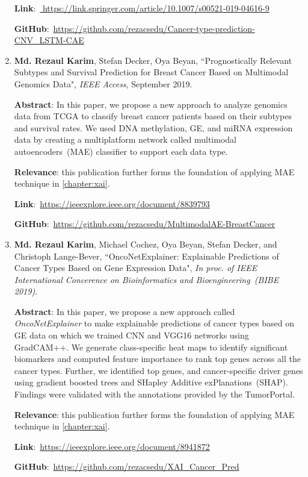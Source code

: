 \begin{enumerate}
	\textbf{Link}:~\url{	https://link.springer.com/article/10.1007/s00521-019-04616-9}
	
	\textbf{GitHub}:~\url{https://github.com/rezacsedu/Cancer-type-prediction-CNV_LSTM-CAE} 
	
	\item \textbf{Md. Rezaul Karim}, Stefan Decker, Oya Beyan, ``Prognostically Relevant Subtypes and Survival Prediction for Breast Cancer Based on Multimodal Genomics Data", \emph{IEEE Access}, September 2019.
	
	\textbf{Abstract}: In this paper, we propose a new approach to analyze genomics data from TCGA to classify breast cancer patients based on their subtypes and survival rates. We used DNA methylation, GE, and miRNA expression data by creating a multiplatform network called multimodal autoencoders~(MAE) classifier to support each data type.
	
	\textbf{Relevance}: this publication further forms the foundation of applying MAE technique in \cref{chapter:xai}.
	
	\textbf{Link}:~\url{https://ieeexplore.ieee.org/document/8839793}
	
	\textbf{GitHub}:~\url{https://github.com/rezacsedu/MultimodalAE-BreastCancer}
	
	\item \textbf{Md. Rezaul Karim}, Michael Cochez, Oya Beyan, Stefan Decker, and Christoph Lange-Bever, ``OncoNetExplainer: Explainable Predictions of Cancer Types Based on Gene Expression Data", \emph{In proc. of IEEE International Concerence on Bioinformatics and Bioengineering~(BIBE 2019)}.
	
	\textbf{Abstract}: In this paper, we propose a new approach called \emph{OncoNetExplainer} to make explainable predictions of cancer types based on GE data on which we trained CNN and VGG16 networks using GradCAM++. We generate class-specific heat maps to identify significant biomarkers and computed feature importance to rank top genes across all the cancer types. Further, we identified top genes, and cancer-specific driver genes using gradient boosted trees and SHapley Additive exPlanations~(SHAP). Findings were validated with the annotations provided by the TumorPortal. 
	
	\textbf{Relevance}: this publication further forms the foundation of applying MAE technique in \cref{chapter:xai}.
	
	\textbf{Link}:~\url{https://ieeexplore.ieee.org/document/8941872}

	\textbf{GitHub}:~\url{https://github.com/rezacsedu/XAI_Cancer_Pred}
\end{enumerate}

